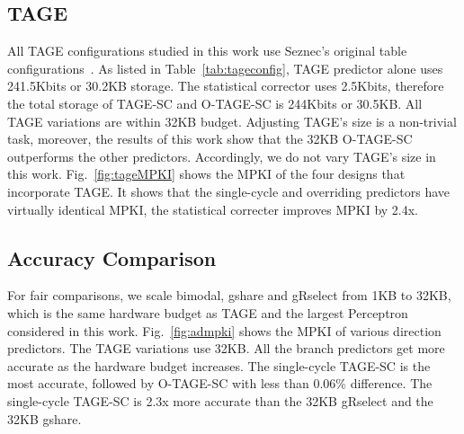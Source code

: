 \subsection{TAGE}
\label{sec:eval:advanced:tage}
All TAGE configurations studied in this work use Seznec’s original table configurations~\cite{tage}. As listed in Table~\ref{tab:tageconfig}, TAGE predictor alone uses 241.5Kbits or \mytilde30.2KB storage. The statistical corrector uses 2.5Kbits, therefore the total storage of \mbox{TAGE-SC} and \mbox{O-TAGE-SC} is 244Kbits or 30.5KB. All TAGE variations are within 32KB budget. Adjusting TAGE's size is a non-trivial task, moreover, the results of this work show that the 32KB \mbox{O-TAGE-SC} outperforms the other predictors. Accordingly, we do not vary TAGE's size in this work. Fig.~\ref{fig:tageMPKI} shows the MPKI of the four designs that incorporate TAGE. It shows that the single-cycle and overriding predictors have virtually identical MPKI, the statistical correcter improves MPKI by \mytilde 2.4x.



\subsection{Accuracy Comparison}
\label{sec:eval:advanced:comparison}
For fair comparisons, we scale bimodal, gshare and gRselect from 1KB to 32KB, which is the same hardware budget as TAGE and the largest Perceptron considered in this work. Fig.~\ref{fig:admpki} shows the MPKI of various direction predictors. The TAGE variations use 32KB. All the branch predictors get more accurate as the hardware budget increases. The single-cycle \mbox{TAGE-SC} is the most accurate, followed by \mbox{O-TAGE-SC} with less than 0.06\% difference. The single-cycle \mbox{TAGE-SC} is \mytilde 2.3x more accurate than the 32KB gRselect and the 32KB gshare.

